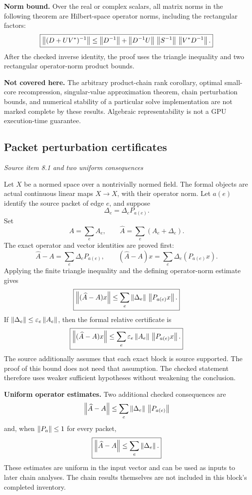 \textbf{Norm bound.} Over the real or complex scalars, all matrix norms in the following theorem are Hilbert-space operator norms, including the rectangular factors:
\[
\boxed{
\left\lVert(D+UV^*)^{-1}\right\rVert
\le\left\lVert D^{-1}\right\rVert+
\left\lVert D^{-1}U\right\rVert\,\left\lVert S^{-1}\right\rVert\,\left\lVert V^*D^{-1}\right\rVert.
}
\]
After the checked inverse identity, the proof uses the triangle inequality and two rectangular operator-norm product bounds.

\textbf{Not covered here.} The arbitrary product-chain rank corollary, optimal small-core recompression, singular-value approximation theorem, chain perturbation bounds, and numerical stability of a particular solve implementation are not marked complete by these results. Algebraic representability is not a GPU execution-time guarantee.



\subsection{Packet perturbation certificates}\label{supp1:subsection:004}\textit{Source item 8.1 and two uniform consequences}\par
Let $X$ be a normed space over a nontrivially normed field. The formal objects are actual continuous linear maps $X\to X$, with their operator norm. Let $a(e)$ identify the source packet of edge $e$, and suppose
\[
\Delta_e=\Delta_e P_{a(e)}.
\]
Set
\[
A=\sum_e A_e,\qquad \widehat A=\sum_e(A_e+\Delta_e).
\]
The exact operator and vector identities are proved first:
\[
\widehat A-A=\sum_e\Delta_e P_{a(e)},\qquad
(\widehat A-A)x=\sum_e\Delta_e(P_{a(e)}x).
\]
Applying the finite triangle inequality and the defining operator-norm estimate gives
\[
\boxed{
\left\lVert(\widehat A-A)x\right\rVert
\le\sum_e\left\lVert\Delta_e\right\rVert\,\left\lVert P_{a(e)}x\right\rVert.
}
\]
If $\left\lVert\Delta_e\right\rVert\le\varepsilon_e\left\lVert A_e\right\rVert$, then the formal relative certificate is
\[
\boxed{
\left\lVert(\widehat A-A)x\right\rVert
\le\sum_e\varepsilon_e\left\lVert A_e\right\rVert\,\left\lVert P_{a(e)}x\right\rVert.
}
\]
The source additionally assumes that each exact block is source supported. The proof of this bound does not need that assumption. The checked statement therefore uses weaker sufficient hypotheses without weakening the conclusion.

\textbf{Uniform operator estimates.} Two additional checked consequences are
\[
\left\lVert\widehat A-A\right\rVert
\le\sum_e\left\lVert\Delta_e\right\rVert\,\left\lVert P_{a(e)}\right\rVert
\]
and, when $\left\lVert P_a\right\rVert\le1$ for every packet,
\[
\boxed{\left\lVert\widehat A-A\right\rVert\le\sum_e\left\lVert\Delta_e\right\rVert.}
\]
These estimates are uniform in the input vector and can be used as inputs to later chain analyses. The chain results themselves are not included in this block's completed inventory.


